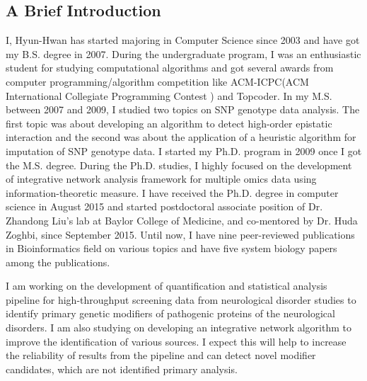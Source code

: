 \documentclass[a0,portrait]{a0poster}
\begin{document}
\begin{multicols}{2} %


\color{Black} %

\section*{A Brief Introduction}

I, Hyun-Hwan has started majoring in Computer Science since 2003 and have got my B.S. degree in 2007. During the undergraduate program, I was an enthusiastic student for studying computational algorithms and got several awards from computer programming/algorithm competition like ACM-ICPC(ACM International Collegiate Programming Contest
) and Topcoder. 
In my M.S. between 2007 and 2009, I studied two topics on SNP genotype data analysis. The first topic was about developing an algorithm to detect high-order epistatic interaction and the second was about the application of a heuristic algorithm for imputation of SNP genotype data. I started my Ph.D. program in 2009 once I got the M.S. degree.
During the Ph.D. studies, I highly focused on the development of integrative network analysis framework for multiple omics data using information-theoretic measure. I have received the Ph.D. degree in computer science in August 2015 and started postdoctoral associate position of Dr. Zhandong Liu's lab at Baylor College of Medicine, and co-mentored by Dr. Huda Zoghbi, since September 2015. 
Until now, I have nine peer-reviewed publications in Bioinformatics field on various topics and have five system biology papers among the publications. 

I am working on the development of quantification and statistical analysis pipeline for high-throughput screening data from neurological disorder studies to identify primary genetic modifiers of pathogenic proteins of the neurological disorders. 
I am also studying on developing an integrative network algorithm to improve the identification of various sources. I expect this will help to increase the reliability of results from the pipeline and can detect novel modifier candidates, which are not identified primary analysis. 


\end{multicols}
\end{document}
